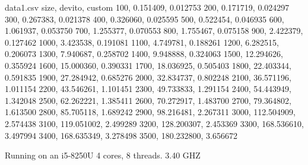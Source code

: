 \documentclass{article}
\begin{document}
\begin{filecontents*}{data1.csv}
	size, devito, custom
	100, 0.151409, 0.012753
	200, 0.171719, 0.024297
	300, 0.267383, 0.021378
	400, 0.326060, 0.025595
	500, 0.522454, 0.046935
	600, 1.061937, 0.053750
	700, 1.255377, 0.070553
	800, 1.755467, 0.075158
	900, 2.422379, 0.127462
	1000, 3.423538, 0.191081
	1100, 4.749781, 0.188261
	1200, 6.282515, 0.206073
	1300, 7.940687, 0.258702
	1400, 9.948888, 0.324063
	1500, 12.294626, 0.355924
	1600, 15.000360, 0.390331
	1700, 18.036925, 0.505403
	1800, 22.403344, 0.591835
	1900, 27.284942, 0.685276
	2000, 32.834737, 0.802248
	2100, 36.571196, 1.011154
	2200, 43.546261, 1.101451
	2300, 49.733833, 1.291154
	2400, 54.443949, 1.342048
	2500, 62.262221, 1.385411
	2600, 70.272917, 1.483700
	2700, 79.364802, 1.613500
	2800, 85.705118, 1.689242
	2900, 98.216481, 2.267311
	3000, 112.504909, 2.574438
	3100, 119.051002, 2.499289
	3200, 128.200307, 2.453369
	3300, 168.536610, 3.497994
	3400, 168.635349, 3.278498
	3500, 180.232800, 3.656672
\end{filecontents*}
Running on an i5-8250U 4 cores, 8 threads. 3.40 GHZ \\ \\
\end{document}
